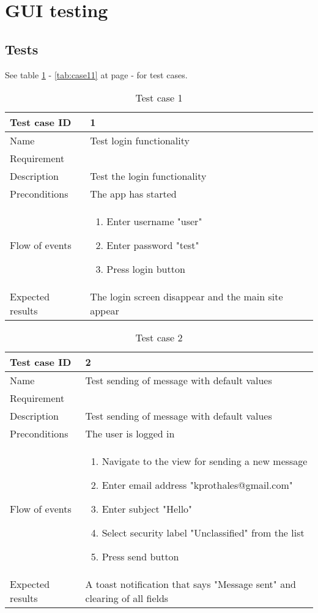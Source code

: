 
\section{GUI testing}
	\subsection{Tests}
See table \ref{tab:case1} - \ref{tab:case11} at page \pageref{tab:case1} - \pageref{tab:case11} for test cases.
\begin{table}
\begin{tabular}{l|p{10cm}}
Test case ID & 1 \\ \hline
Name & Test login functionality\\ \hline
Requirement & \\ \hline
Description & Test the login functionality\\ \hline
Preconditions & The app has started\\ \hline
Flow of events & 
\begin{enumerate}
\item{}Enter username "user"
\item{}Enter password "test"
\item{}Press login button
\end{enumerate} \\ \hline
Expected results & The login screen disappear and the main site appear
\end{tabular}
\caption{Test case 1} \label{tab:case1}
\end{table}

\begin{table}
\begin{tabular}{l|p{10cm}}
Test case ID & 2 \\ \hline
Name & Test sending of message with default values\\ \hline
Requirement & \\ \hline
Description & Test sending of message with default values\\ \hline
Preconditions & The user is logged in\\ \hline
Flow of events & 
\begin{enumerate}
\item{}Navigate to the view for sending a new message
\item{}Enter email address "kprothales@gmail.com"
\item{}Enter subject "Hello"
\item{}Select security label "Unclassified" from the list
\item{}Press send button
\end{enumerate} \\ \hline
Expected results & A toast notification that says "Message sent" and clearing of all fields
\end{tabular}
\caption{Test case 2} \label{tab:case2}
\end{table}


